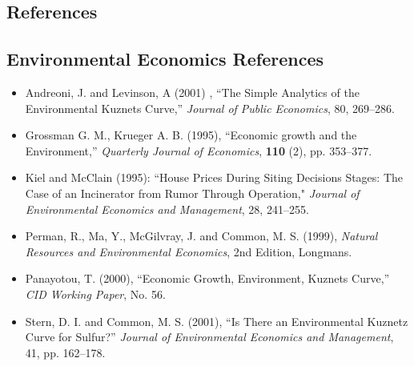 \documentclass[landscape,letterpaper,9pt]{article}
\begin{document}
\begin{itemize}
\newpage
\section{References}

\subsection{Environmental Economics  References}
\begin{itemize}
\item Andreoni, J. and Levinson, A (2001) , ``The Simple Analytics of the Environmental Kuznets Curve,''
\textit{Journal of Public Economics}, 80, 269--286.
\item Grossman G. M., Krueger A. B. (1995),
``Economic growth and the Environment,'' \textit{Quarterly Journal of Economics}, \textbf{110} (2), pp. 353--377.
\item
Kiel and McClain (1995): ``House Prices  During  Siting  Decisions Stages: The Case of an Incinerator
from Rumor Through Operation," \emph{Journal of Environmental Economics and Management}, 28, 241--255.
\item Perman, R., Ma, Y., McGilvray, J. and Common, M. S. (1999),
\emph{Natural Resources and Environmental Economics}, 2nd Edition,
  Longmans.
\item Panayotou, T. (2000), ``Economic Growth, Environment, Kuznets Curve,''
\emph{CID Working Paper}, No. 56.
\item Stern, D. I. and Common, M. S. (2001), ``Is There an Environmental Kuznetz Curve for Sulfur?''
\emph{Journal of Environmental Economics and Management}, 41, pp. 162--178.
\end{itemize}

\end{itemize}
\end{document}
